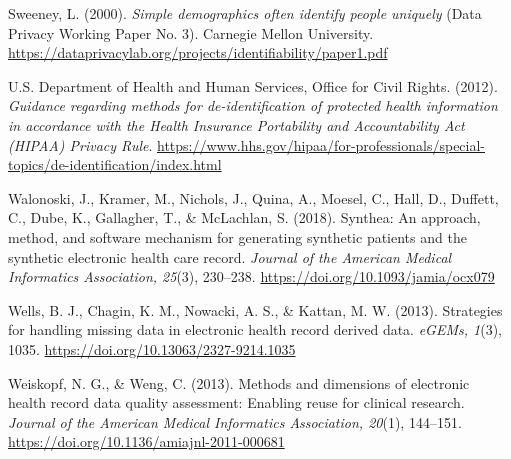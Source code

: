 Sweeney, L. (2000). \emph{Simple demographics often identify people uniquely} (Data Privacy Working
Paper No. 3). Carnegie Mellon University.
\url{https://dataprivacylab.org/projects/identifiability/paper1.pdf}\par

U.S. Department of Health and Human Services, Office for Civil Rights. (2012). \emph{Guidance regarding
methods for de-identification of protected health information in accordance with the Health Insurance
Portability and Accountability Act (HIPAA) Privacy Rule}.
\url{https://www.hhs.gov/hipaa/for-professionals/special-topics/de-identification/index.html}\par

Walonoski, J., Kramer, M., Nichols, J., Quina, A., Moesel, C., Hall, D., Duffett, C., Dube, K.,
Gallagher, T., \& McLachlan, S. (2018). Synthea: An approach, method, and software mechanism for
generating synthetic patients and the synthetic electronic health care record. \emph{Journal of the
American Medical Informatics Association, 25}(3), 230--238.
\url{https://doi.org/10.1093/jamia/ocx079}\par

Wells, B. J., Chagin, K. M., Nowacki, A. S., \& Kattan, M. W. (2013). Strategies for handling missing
data in electronic health record derived data. \emph{eGEMs, 1}(3), 1035.
\url{https://doi.org/10.13063/2327-9214.1035}\par

Weiskopf, N. G., \& Weng, C. (2013). Methods and dimensions of electronic health record data quality
assessment: Enabling reuse for clinical research. \emph{Journal of the American Medical Informatics
Association, 20}(1), 144--151. \url{https://doi.org/10.1136/amiajnl-2011-000681}\par

\endgroup
